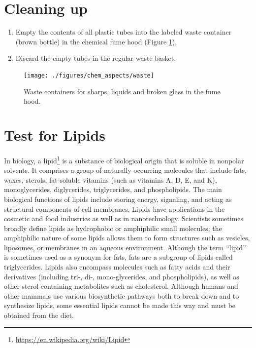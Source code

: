 \documentclass[]{book}
\providecommand{\tightlist}{%
  \setlength{\itemsep}{0pt}\setlength{\parskip}{0pt}}
\let\rmarkdownfootnote\footnote%
\def\footnote{\protect\rmarkdownfootnote}
\renewcommand{\href}[2]{#2\footnote{\url{#1}}}
\theoremstyle{definition}
\theoremstyle{definition}
\theoremstyle{definition}
\theoremstyle{remark}
\begin{document}
\section{Cleaning up}\label{cleaning-up}

\begin{enumerate}
\def\labelenumi{\arabic{enumi}.}
\tightlist
\item
  Empty the contents of all plastic tubes into the labeled waste
  container (brown bottle) in the chemical fume hood (Figure
  \ref{fig:waste}).
\item
  Discard the empty tubes in the regular waste basket.
\end{enumerate}

\begin{figure}

{\centering \texttt{[image: ./figures/chem\_aspects/waste]} 

}

\caption{Waste containers for sharps, liquids and broken glass in the fume hood.}\label{fig:waste}
\end{figure}

\section{Test for Lipids}\label{test-for-lipids}

In biology, a \href{https://en.wikipedia.org/wiki/Lipid}{lipid} is a
substance of biological origin that is soluble in nonpolar solvents. It
comprises a group of naturally occurring molecules that include fats,
waxes, sterols, fat-soluble vitamins (such as vitamins A, D, E, and K),
monoglycerides, diglycerides, triglycerides, and phospholipids. The main
biological functions of lipids include storing energy, signaling, and
acting as structural components of cell membranes. Lipids have
applications in the cosmetic and food industries as well as in
nanotechnology. Scientists sometimes broadly define lipids as
hydrophobic or amphiphilic small molecules; the amphiphilic nature of
some lipids allows them to form structures such as vesicles, liposomes,
or membranes in an aqueous environment. Although the term ``lipid'' is
sometimes used as a synonym for fats, fats are a subgroup of lipids
called triglycerides. Lipids also encompass molecules such as fatty
acids and their derivatives (including tri-, di-, mono-glycerides, and
phospholipids), as well as other sterol-containing metabolites such as
cholesterol. Although humans and other mammals use various biosynthetic
pathways both to break down and to synthesize lipids, some essential
lipids cannot be made this way and must be obtained from the diet.
\end{document}
